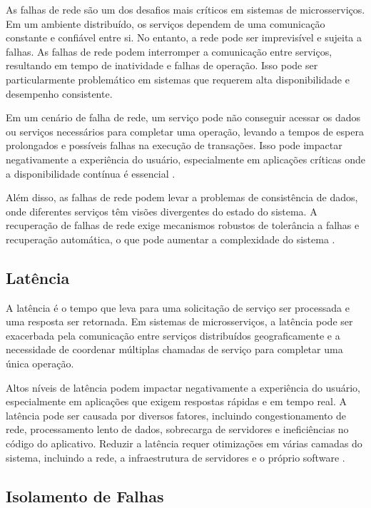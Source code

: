 As falhas de rede são um dos desafios mais críticos em sistemas de microsserviços. Em um ambiente distribuído, os serviços dependem de uma comunicação constante e confiável entre si. No entanto, a rede pode ser imprevisível e sujeita a falhas. As falhas de rede podem interromper a comunicação entre serviços, resultando em tempo de inatividade e falhas de operação. Isso pode ser particularmente problemático em sistemas que requerem alta disponibilidade e desempenho consistente.

Em um cenário de falha de rede, um serviço pode não conseguir acessar os dados ou serviços necessários para completar uma operação, levando a tempos de espera prolongados e possíveis falhas na execução de transações. Isso pode impactar negativamente a experiência do usuário, especialmente em aplicações críticas onde a disponibilidade contínua é essencial \cite{tanenbaum2007}.

Além disso, as falhas de rede podem levar a problemas de consistência de dados, onde diferentes serviços têm visões divergentes do estado do sistema. A recuperação de falhas de rede exige mecanismos robustos de tolerância a falhas e recuperação automática, o que pode aumentar a complexidade do sistema \cite{brewer2000}.

\subsection{Latência}

A latência é o tempo que leva para uma solicitação de serviço ser processada e uma resposta ser retornada. Em sistemas de microsserviços, a latência pode ser exacerbada pela comunicação entre serviços distribuídos geograficamente e a necessidade de coordenar múltiplas chamadas de serviço para completar uma única operação.

Altos níveis de latência podem impactar negativamente a experiência do usuário, especialmente em aplicações que exigem respostas rápidas e em tempo real. A latência pode ser causada por diversos fatores, incluindo congestionamento de rede, processamento lento de dados, sobrecarga de servidores e ineficiências no código do aplicativo. Reduzir a latência requer otimizações em várias camadas do sistema, incluindo a rede, a infraestrutura de servidores e o próprio software \cite{dean2013}.

\subsection{Isolamento de Falhas}

